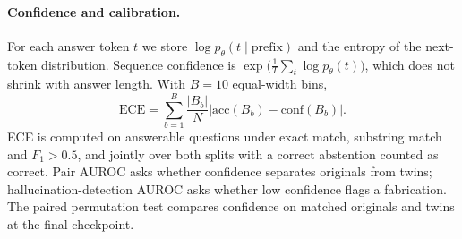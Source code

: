 \documentclass[11pt]{article}
\begin{document}
\paragraph{Confidence and calibration.}
For each answer token $t$ we store $\log p_\theta(t\mid\text{prefix})$ and the entropy of the next-token distribution. Sequence confidence is $\exp\bigl(\tfrac{1}{T}\sum_t \log p_\theta(t)\bigr)$, which does not shrink with answer length. With $B=10$ equal-width bins,
\[
\mathrm{ECE} = \sum_{b=1}^{B} \frac{|B_b|}{N}\bigl|\mathrm{acc}(B_b)-\mathrm{conf}(B_b)\bigr|.
\]
ECE is computed on answerable questions under exact match, substring match and $F_1>0.5$, and jointly over both splits with a correct abstention counted as correct. Pair AUROC asks whether confidence separates originals from twins; hallucination-detection AUROC asks whether low confidence flags a fabrication. The paired permutation test compares confidence on matched originals and twins at the final checkpoint.
\end{document}
